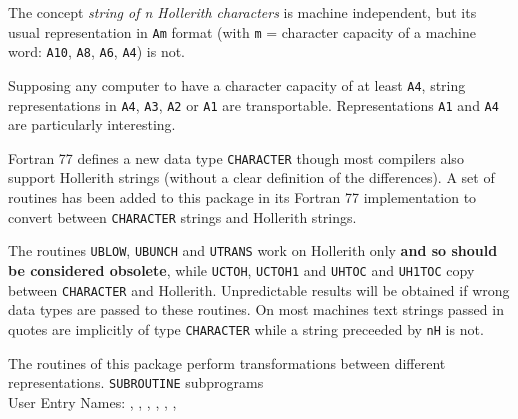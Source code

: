                                
                                
\Submitter{}                                    
             
\begin{center}
\end{center}
The concept {\it string of n Hollerith characters} is machine
independent, but its usual representation in {\tt Am} format
(with {\tt m} = character capacity of a machine word:
{\tt A10}, {\tt A8}, {\tt A6}, {\tt A4}) is not.
\par
Supposing any computer to have a character capacity of at
least {\tt A4}, string representations in {\tt A4}, {\tt A3}, {\tt A2} or
{\tt A1} are transportable. Representations {\tt A1} and {\tt A4}
are particularly interesting.
\par
Fortran 77 defines a new data type {\tt CHARACTER}
though most compilers also support Hollerith strings (without a clear
definition of the differences). A set of routines has been added to
this package in its Fortran 77 implementation to convert between
{\tt CHARACTER} strings and Hollerith strings.
\par
The routines {\tt UBLOW}, {\tt UBUNCH} and {\tt UTRANS} work on
Hollerith only {\bf and so should be considered obsolete},
while {\tt UCTOH}, {\tt UCTOH1} and {\tt UHTOC} and
{\tt UH1TOC} copy between {\tt CHARACTER} and Hollerith.
Unpredictable results will be obtained if wrong data types are
passed to these routines. On most machines text strings passed in
quotes are implicitly of type {\tt CHARACTER} while a string preceeded by
{\tt nH} is not.
\par
The routines of this package perform transformations between different
representations.
\Structure
{\tt SUBROUTINE} subprograms \\
User Entry Names: , , ,
, , ,  \\
